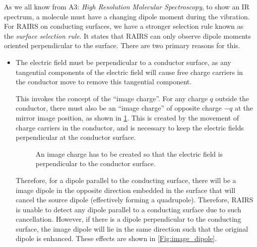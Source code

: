 \documentclass{article}
\theoremstyle{plain}\theoremheaderfont{\normalfont\itshape}\theorembodyfont{\rmfamily}\theoremseparator{.}\newtheorem*{rem}{Remark}\newtheorem*{ex}{Example}\newtheorem*{proof}{Proof}\newtheorem*{altp}{Alternative proof}
\theoremstyle{plain}\theoremheaderfont{\normalfont\bfseries}\theorembodyfont{\rmfamily}\theoremseparator{.}\newtheorem{thm}{Theorem}[section]\newtheorem{lem}[thm]{Lemma}\newtheorem{prop}[thm]{Proposition}\newtheorem*{cor}{Corollary}\newtheorem{defn}[thm]{Definition}\newtheorem{clm}[thm]{Claim}\newtheorem{clminproof}{Claim}\newtheorem*{law}{Law}\newtheorem{pos}[thm]{Postulate}
\theoremstyle{break}\theoremheaderfont{\normalfont\itshape}\theorembodyfont{\rmfamily}\theoremseparator{.\medskip}\newtheorem*{proofskip}{Proof}\newtheorem*{exs}{Examples}\newtheorem*{rems}{Remarks}
\theoremstyle{break}\theoremheaderfont{\normalfont\bfseries}\theorembodyfont{\rmfamily}\theoremseparator{.\medskip}\newtheorem{lemskip}[thm]{Lemma}\newtheorem{defnskip}[thm]{Definition}\newtheorem{propskip}[thm]{Proposition}\newtheorem{thmskip}[thm]{Theorem}
\numberwithin{equation}{section}
\begin{document}
	As we all know from A3: \textit{High Resolution Molecular Spectroscopy}, to show an IR spectrum, a molecule must have a changing dipole moment during the vibration. For RAIRS on conducting surfaces, we have a stronger selection rule known as the \textit{surface selection rule}. It states that RAIRS can only observe dipole moments oriented perpendicular to the surface. There are two primary reasons for this.
	\begin{itemize}[topsep=0pt]
		\item The electric field must be perpendicular to a conductor surface, as any tangential components of the electric field will cause free charge carriers in the conductor move to remove this tangential component.
		
		This invokes the concept of the ``image charge''. For any charge \(q\) outside the conductor, there must also be an ``image charge'' of opposite charge \(-q\) at the mirror image position, as shown in \cref{Fig:image_charge}. This is created by the movement of charge carriers in the conductor, and is necessary to keep the electric fields perpendicular at the conductor surface.

		\begin{figure}[ht!]
			\centering
			\caption{An image charge has to be created so that the electric field is perpendicular to the conductor surface.}
			\label{Fig:image_charge}
		\end{figure}

		Therefore, for a dipole parallel to the conducting surface, there will be a image dipole in the opposite direction embedded in the surface that will cancel the source dipole (effectively forming a quadrupole). Therefore, RAIRS is unable to detect any dipole parallel to a conducting surface due to such cancellation. However, if there is a dipole perpendicular to the conducting surface, the image dipole will lie in the same direction such that the original dipole is enhanced. These effects are shown in \cref{Fig:image_dipole}.


\end{itemize}
\end{document}
